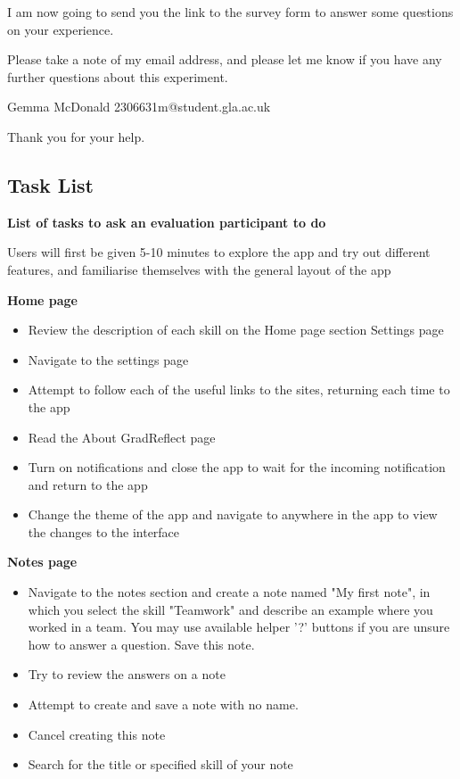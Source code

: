 \documentclass{l4proj}
\begin{document}
\begin{appendices}
I am now going to send you the link to the survey form to answer some questions on your experience.

Please take a note of my email address, and please let me know if you have any further questions about this experiment.

Gemma McDonald 2306631m@student.gla.ac.uk

Thank you for your help.


\subsection{Task List} \label{Appendix-taskList}

\textbf{List of tasks to ask an evaluation participant to do}

Users will first be given 5-10 minutes to explore the app and try out different features, and familiarise themselves with the general layout of the app

\textbf{Home page}

\begin{itemize}
    \item Review the description of each skill on the Home page section Settings page
    \item Navigate to the settings page
    \item Attempt to follow each of the useful links to the sites, returning each time to the app
    \item Read the About GradReflect page
    \item Turn on notifications and close the app to wait for the incoming notification and return to the app
    \item Change the theme of the app and navigate to anywhere in the app to view the changes to the interface
\end{itemize}

\textbf{Notes page}

\begin{itemize}
    \item Navigate to the notes section and create a note named "My first note", in which you select the skill "Teamwork" and describe an example where you worked in a team. You may use available helper '?' buttons if you are unsure how to answer a question. Save this note.
    \item Try to review the answers on a note
    \item Attempt to create and save a note with no name.
    \item Cancel creating this note
    \item Search for the title or specified skill of your note
\end{itemize}


\end{appendices}
\end{document}
